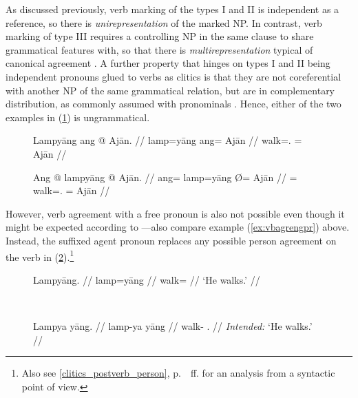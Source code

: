 As discussed previously, verb marking of the types I and II is independent as a
reference, so there is \emph{unirepresentation} of the marked NP. In contrast,
verb marking of type III requires a controlling NP in the same clause to share
grammatical features with, so that there is \emph{multirepresentation} typical
of canonical agreement \citep[106]{corbett2006}.
A further property that hinges on types I and II being independent pronouns
glued to verbs as clitics is that they are not coreferential with another NP of
the same grammatical relation, but are in complementary distribution, as
commonly assumed with pronominals \citep[108]{corbett2006}. Hence, either of
the two examples in (\ref{ex:subjclitcoref}) is ungrammatical.

\begin{figure}[h]
\pex\label{ex:subjclitcoref} %
\a\ljudge* \begingl
	\gla Lampyāng ang @ Ajān. //
	\glb lamp=yāng ang= ​Ajān //
	\glc walk=\TsgM{}.\Aarg{} \Aarg{}= Ajān //
\endgl

\a\ljudge* \begingl	
	\gla Ang @ lampyāng {} @ Ajān. //
	\glb ang= lamp=yāng Ø= ​Ajān //
	\glc \AgtT{}= walk=\TsgM{}.\Aarg{} \Top{}= ​Ajān //
\endgl
\xe
\end{figure}

However, verb agreement with a free pronoun is also not possible even though it
might be expected according to \citep[109]{corbett2006}---also compare example
(\ref{ex:vbagrengpr}) above. Instead, the suffixed agent pronoun replaces any
possible person agreement on the verb in (\ref{ex:proclitcoref}).\footnote{Also
see \autoref{clitics_postverb_person}, p.~\pageref{clitics_postverb_person}~ff.
for an analysis from a syntactic point of view.}

\begin{figure}[h]
\ex{}\label{ex:proclitcoref} %
\begin{minipage}[t]{.5\remaining}
\tl\quad\begingl
	\gla Lampyāng. //
	\glb lamp=yāng //
	\glc walk=\TsgM{} //
	\glft `He walks.' //
\endgl
\end{minipage}
~
\begin{minipage}[t]{.5\remaining}
\tl\quad\ljudge* \begingl	
	\gla Lampya yāng. //
	\glb lamp-ya yāng //
	\glc walk-\TsgM{} \TsgM{}.\Aarg{} //
	\glft \textit{Intended:} `He walks.' //
\endgl
\end{minipage}
\xe
\end{figure}

